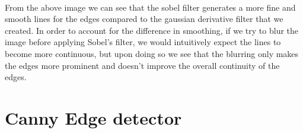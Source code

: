 \documentclass[11pt]{article}
\begin{document}
    \begin{center}
    \end{center}
    { \hspace*{\fill} \\}
    
    From the above image we can see that the sobel filter generates a more
fine and smooth lines for the edges compared to the gaussian derivative
filter that we created. In order to account for the difference in
smoothing, if we try to blur the image before applying Sobel's filter,
we would intuitively expect the lines to become more continuous, but
upon doing so we see that the blurring only makes the edges more
prominent and doesn't improve the overall continuity of the edges.

    \hypertarget{canny-edge-detector}{%
\section{Canny Edge detector}\label{canny-edge-detector}}
\end{document}
